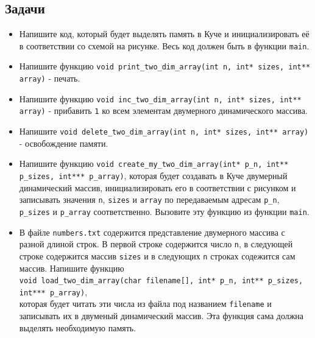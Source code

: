 \documentclass{article}
\begin{document}
\subsection*{Задачи}
\begin{itemize}


\item Напишите код, который будет выделять память в Куче и инициализировать её в соответствии со схемой на рисунке. Весь код должен быть в функции \texttt{main}.
\item Напишите функцию \texttt{void print\_two\_dim\_array(int n, int* sizes, int** array)} - печать.
\item Напишите функцию \texttt{void inc\_two\_dim\_array(int n, int* sizes, int** array)} - прибавить \texttt{1} ко всем элементам двумерного динамического массива.
\item Напишите \texttt{void delete\_two\_dim\_array(int n, int* sizes, int** array)} - освобождение памяти.
\item Напишите функцию \texttt{void create\_my\_two\_dim\_array(int* p\_n, int** p\_sizes, int*** p\_array)}, которая будет создавать в Куче двумерный динамический массив, инициализировать его в соответствии с рисунком и записывать значения \texttt{n}, \texttt{sizes} и \texttt{array} по передаваемым адресам \texttt{p\_n}, \texttt{p\_sizes} и \texttt{p\_array} соответственно. Вызовите эту функцию из функции \texttt{main}.
\item В файле \texttt{numbers.txt} содержится представление двумерного массива с разной длиной строк. В первой строке содержится число \texttt{n}, в следующей строке содержится массив \texttt{sizes} и в следующих \texttt{n} строках содежится сам массив. Напишите функцию\\
\texttt{void load\_two\_dim\_array(char filename[], int* p\_n, int** p\_sizes, int*** p\_array)}, \\
которая будет читать эти числа из файла под названием \texttt{filename} и записывать их в двуменый динамический массив. Эта функция сама должна выделять необходимую память.

\end{itemize}
\newpage
\end{document}
